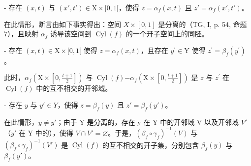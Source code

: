 - 存在 \((x,t)\) 与 \((x',t') \in \mathrm{X} \times [0,1[\)，使得 \(z = \alpha_f(x,t)\) 且 \(z' = \alpha_f(x',t')\)。

在此情形，断言由如下事实得出：空间 \(X \times [0,1]\) 是分离的（TG, I, p. 54, 命题 7），且映射 \(\alpha_{f}\) 诱导该空间到 \(\operatorname{Cyl}(f)\) 的一个开子空间上的同胚。

- 存在 \((x,t)\in \mathrm{X}\times [0,1[\) 使得 \(z = \alpha_{f}(x,t)\)，且存在 \(y^{\prime}\in \mathrm{Y}\) 使得 \(z^{\prime} = \beta_{f}(y^{\prime})\)。

此时，\(\alpha_{f}(\mathrm{X}\times [0,\frac{t + 1}{2}])\) 与 \(\operatorname {Cyl}(f)\mathbf{-}\alpha_{f}(\mathrm{X}\times [0,\frac{t + 1}{2}])\) 是 \(z\) 与 \(z^{\prime}\) 在 \(\operatorname {Cyl}(f)\) 中的互不相交的开邻域。

- 存在 \(y\) 与 \(y'\in Y\)，使得 \(z=\beta_f(y)\) 且 \(z'=\beta_f(y')\)。

在此情形，\(y\neq y'\)；由于 Y 是分离的，存在 y 在 Y 中的开邻域 V 以及开邻域 \(V'\)（\(y'\) 在 Y 中的），使得 \(V\cap V'=\varnothing\)。于是，\((\beta_f\circ\gamma_f)^{-1}(V)\) 与 \((\beta_f\circ\gamma_f)^{-1}(V')\) 是 \(\operatorname{Cyl}(f)\) 的互不相交的开子集，分别包含 \(\beta_f(y)\) 与 \(\beta_f(y')\)。

